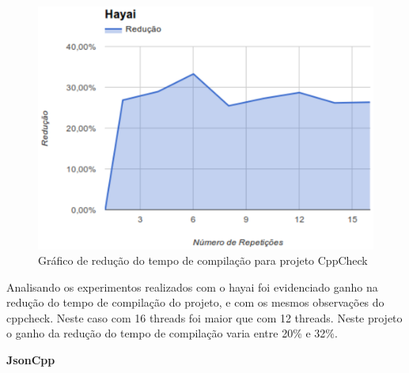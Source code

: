 \begin{figure}[h]
    \centering
        \includegraphics[keepaspectratio=true,scale=1]{figuras/hayai.eps}
    \caption{Gráfico de redução do tempo de compilação para projeto CppCheck}
    \label{hayai}
\end{figure}

Analisando os experimentos realizados com o hayai foi evidenciado ganho
 na redução do tempo de compilação do projeto, e com os mesmos
 observações do cppcheck. Neste caso com 16 threads foi maior que com
 12 threads. Neste projeto o ganho da redução do tempo de
 compilação varia entre 20\% e 32\%.

\textbf{JsonCpp}


